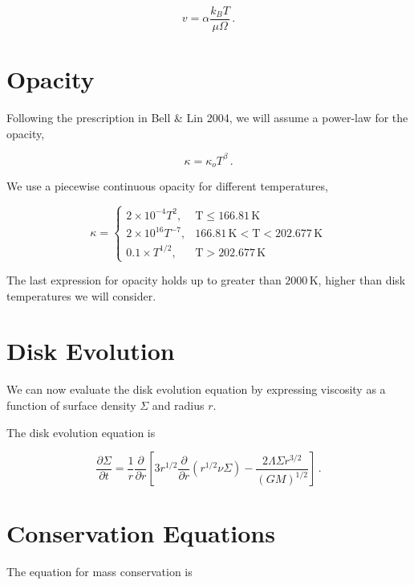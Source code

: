 \documentclass{article}
\begin{document}
\begin{equation}
v = 	\alpha \frac{k_B T}{\mu \Omega}\,.
\end{equation}

\section{Opacity}

Following the prescription in Bell \& Lin 2004, we will assume a power-law for the opacity,

\begin{equation}
\kappa = \kappa_o T^\beta\,.
\end{equation} 

We use a piecewise continuous opacity  for different temperatures,

$$\kappa =
\begin{cases}
2\times 10^{-4} T^2, & \textrm{T} \leq 166.81\, \textrm{K} \\
2\times 10^{16} T^{-7}, & 166.81\, \textrm{K} <  \textrm{T} < 202.677\, \textrm{K} \\
0.1\times T^{1/2}, & \textrm{T} > 202.677\, \textrm{K}
\end{cases}
$$

The last expression for opacity holds up to greater than $2000$\,K, higher than disk temperatures we will consider.

\section{Disk Evolution}

We can now evaluate the disk evolution equation by expressing viscosity as a function of surface density $\Sigma$ and radius $r$.

The disk evolution equation is

\begin{equation} \label{eq:diskev}
\frac{\partial \Sigma}{\partial t} = \frac{1}{r} \frac{\partial}{\partial r} \left[3 r^{1/2} \frac{\partial}{\partial r} \left(r^{1/2} \nu \Sigma\right) - \frac{2 \Lambda \Sigma r^{3/2}}{(G M)^{1/2}}\right]\,.
\end{equation}

\section{Conservation Equations}

The equation for mass conservation is
\end{document}
